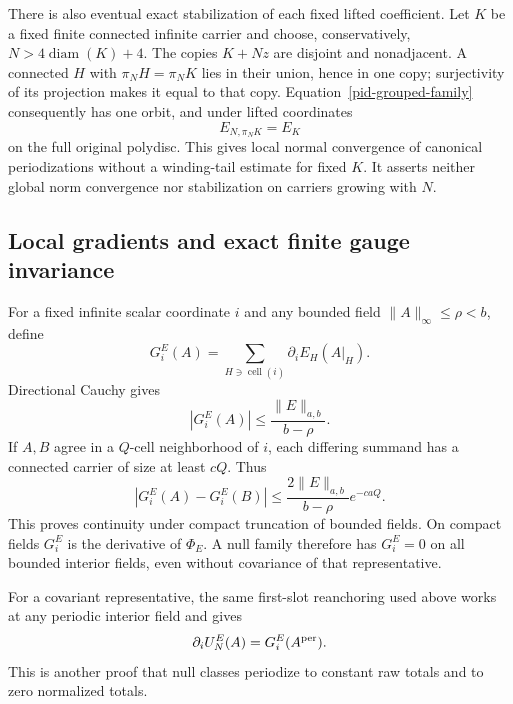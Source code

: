 There is also eventual exact stabilization of each fixed lifted
coefficient. Let $K$ be a fixed finite connected infinite carrier
and choose, conservatively, $N>4\operatorname{diam}(K)+4$.
The copies $K+Nz$ are disjoint and nonadjacent. A connected $H$
with $\pi_NH=\pi_NK$ lies in their union, hence in one copy;
surjectivity of its projection makes it equal to that copy.
Equation~\eqref{pid-grouped-family} consequently has one orbit,
and under lifted coordinates
\begin{equation}
 E_{N,\pi_NK}=E_K
 \label{pid-fixed-carrier}
\end{equation}
on the full original polydisc. This gives local normal convergence
of canonical periodizations without a winding-tail estimate for
fixed $K$. It asserts neither global norm convergence nor
stabilization on carriers growing with $N$.

\subsection{Local gradients and exact finite gauge invariance}
\label{pid-gauge-section}

For a fixed infinite scalar coordinate $i$ and any bounded field
$\|A\|_\infty\le\rho<b$, define
\begin{equation}
 G_i^E(A)=\sum_{H\ni\operatorname{cell}(i)}
                                 \partial_iE_H(A|_H).
 \label{pid-gradient}
\end{equation}
Directional Cauchy gives
\begin{equation}
 |G_i^E(A)|\le\frac{\|E\|_{a,b}}{b-\rho}.
 \label{pid-gradient-bound}
\end{equation}
If $A,B$ agree in a $Q$-cell neighborhood of $i$, each differing
summand has a connected carrier of size at least $cQ$. Thus
\begin{equation}
 |G_i^E(A)-G_i^E(B)|
       \le\frac{2\|E\|_{a,b}}{b-\rho}e^{-caQ}.
 \label{pid-gradient-tail}
\end{equation}
This proves continuity under compact truncation of bounded
fields. On compact fields $G_i^E$ is the derivative of
$\Phi_E$. A null family therefore has $G_i^E=0$ on all
bounded interior fields, even without covariance of that
representative.

For a covariant representative, the same first-slot reanchoring
used above works at any periodic interior field and gives
\begin{equation}
 \partial_iU_N^E(A)=G_i^E(A^{\rm per}).
 \label{pid-periodic-gradient}
\end{equation}
This is another proof that null classes periodize to constant
raw totals and to zero normalized totals.

